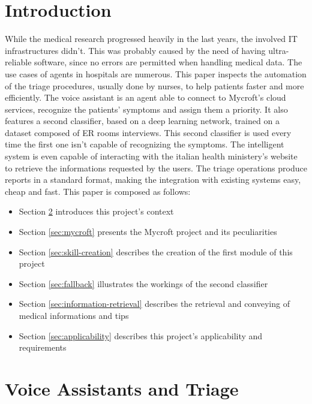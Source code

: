 \documentclass[conference]{IEEEtran}
\begin{document}
\section{Introduction}
While the medical research progressed heavily in the last years, the involved IT infrastructures didn't. This was probably caused by the need of having ultra-reliable software, since no errors are permitted when handling medical data. The use cases of agents in hospitals are numerous. This paper inspects the automation of the triage procedures, usually done by nurses, to help patients faster and more efficiently. The voice assistant is an agent able to connect to Mycroft's cloud services, recognize the patients' symptoms and assign them a priority. It also features a second classifier, based on a deep learning network, trained on a dataset composed of ER rooms interviews. This second classifier is used every time the first one isn't capable of recognizing the symptoms. The intelligent system is even capable of interacting with the italian health ministery's website to retrieve the informations requested by the users. The triage operations produce reports in a standard format, making the integration with existing systems easy, cheap and fast. This paper is composed as follows:
\begin{itemize}
    \item Section \ref{sec:voice-assistants-and-triage} introduces this project's context
    \item Section \ref{sec:mycroft} presents the Mycroft project and its peculiarities
    \item Section \ref{sec:skill-creation} describes the creation of the first module of this project
    \item Section \ref{sec:fallback} illustrates the workings of the second classifier
    \item Section \ref{sec:information-retrieval} describes the retrieval and conveying of medical informations and tips
    \item Section \ref{sec:applicability} describes this project's applicability and requirements
\end{itemize}

\section{Voice Assistants and Triage}
\label{sec:voice-assistants-and-triage}
\end{document}
